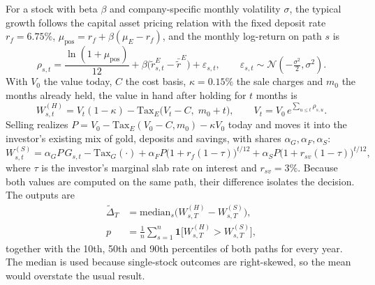 For a stock with beta $\beta$ and company-specific monthly volatility $\sigma$, the typical growth follows the capital asset pricing relation with the fixed deposit rate $r_f = 6.75\%$, $\mu_{\text{pos}} = r_f + \beta(\mu_E - r_f)$, and the monthly log-return on path $s$ is
\begin{equation}
\rho_{s,t} = \frac{\ln(1+\mu_{\text{pos}})}{12} + \beta\big(\tilde{r}^E_{s,t} - \bar{\tilde{r}}^E\big) + \varepsilon_{s,t}, \qquad \varepsilon_{s,t} \sim \mathcal{N}\!\left(-\tfrac{\sigma^2}{2}, \sigma^2\right).
\end{equation}
With $V_0$ the value today, $C$ the cost basis, $\kappa = 0.15\%$ the sale charges and $m_0$ the months already held, the value in hand after holding for $t$ months is
\begin{equation}
W^{(H)}_{s,t} = V_t (1-\kappa) - \mathrm{Tax}_E\big(V_t - C,\; m_0 + t\big), \qquad V_t = V_0\, e^{\sum_{u \leq t} \rho_{s,u}} .
\end{equation}
Selling realizes $P = V_0 - \mathrm{Tax}_E(V_0 - C, m_0) - \kappa V_0$ today and moves it into the investor's existing mix of gold, deposits and savings, with shares $\alpha_G, \alpha_F, \alpha_S$:
\begin{equation}
W^{(S)}_{s,t} = \alpha_G P\,G_{s,t} - \mathrm{Tax}_G(\cdot) + \alpha_F P\big(1 + r_f(1-\tau)\big)^{t/12} + \alpha_S P\big(1 + r_{sv}(1-\tau)\big)^{t/12},
\end{equation}
where $\tau$ is the investor's marginal slab rate on interest and $r_{sv} = 3\%$. Because both values are computed on the same path, their difference isolates the decision. The outputs are
\begin{align}
\tilde{\Delta}_T &= \mathrm{median}_s \big(W^{(H)}_{s,T} - W^{(S)}_{s,T}\big),\\
p &= \frac{1}{n}\sum_{s=1}^{n} \mathbf{1}\big[W^{(H)}_{s,T} > W^{(S)}_{s,T}\big],
\end{align}
together with the 10th, 50th and 90th percentiles of both paths for every year. The median is used because single-stock outcomes are right-skewed, so the mean would overstate the usual result.

